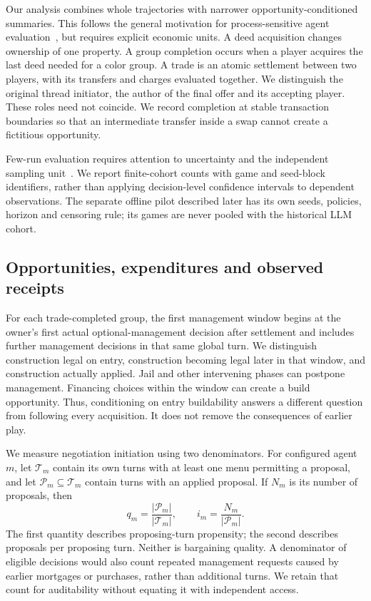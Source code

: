 Our analysis combines whole trajectories with narrower opportunity-conditioned summaries. This follows the general motivation for process-sensitive agent evaluation~\cite{ma2024agentboard}, but requires explicit economic units. A deed acquisition changes ownership of one property. A group completion occurs when a player acquires the last deed needed for a color group. A trade is an atomic settlement between two players, with its transfers and charges evaluated together. We distinguish the original thread initiator, the author of the final offer and its accepting player. These roles need not coincide. We record completion at stable transaction boundaries so that an intermediate transfer inside a swap cannot create a fictitious opportunity.

Few-run evaluation requires attention to uncertainty and the independent sampling unit~\cite{agarwal2021precipice}. We report finite-cohort counts with game and seed-block identifiers, rather than applying decision-level confidence intervals to dependent observations. The separate offline pilot described later has its own seeds, policies, horizon and censoring rule; its games are never pooled with the historical LLM cohort.

\subsection{Opportunities, expenditures and observed receipts}

For each trade-completed group, the first management window begins at the owner's first actual optional-management decision after settlement and includes further management decisions in that same global turn. We distinguish construction legal on entry, construction becoming legal later in that window, and construction actually applied. Jail and other intervening phases can postpone management. Financing choices within the window can create a build opportunity. Thus, conditioning on entry buildability answers a different question from following every acquisition. It does not remove the consequences of earlier play.

We measure negotiation initiation using two denominators. For configured agent $m$, let $\mathcal{T}_m$ contain its own turns with at least one menu permitting a proposal, and let $\mathcal{P}_m\subseteq\mathcal{T}_m$ contain turns with an applied proposal. If $N_m$ is its number of proposals, then
\begin{equation}
 q_m=\frac{|\mathcal{P}_m|}{|\mathcal{T}_m|},
 \qquad
 i_m=\frac{N_m}{|\mathcal{P}_m|}.
 \label{eq:sol-proposals}
\end{equation}
The first quantity describes proposing-turn propensity; the second describes proposals per proposing turn. Neither is bargaining quality. A denominator of eligible decisions would also count repeated management requests caused by earlier mortgages or purchases, rather than additional turns. We retain that count for auditability without equating it with independent access.

